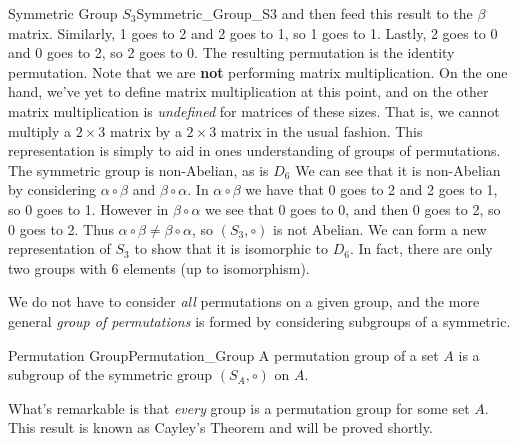\begin{lexample}{Symmetric Group $S_{3}$}{Symmetric_Group_S3}
        and then feed this result to the $\beta$ matrix. Similarly,
        1 goes to 2 and 2 goes to 1, so 1 goes to 1. Lastly, 2 goes to 0 and 0
        goes to 2, so 2 goes to 0. The resulting permutation is the identity
        permutation. Note that we are \textbf{not} performing matrix
        multiplication. On the one hand, we've yet to define matrix
        multiplication at this point, and on the other matrix multiplication is
        \textit{undefined} for matrices of these sizes. That is, we cannot
        multiply a $2\times{3}$ matrix by a $2\times{3}$ matrix in the usual
        fashion. This representation is simply to aid in ones understanding of
        groups of permutations. The symmetric group is non-Abelian, as is
        $D_{6}$ We can see that it is non-Abelian by considering
        $\alpha\circ\beta$ and $\beta\circ\alpha$. In $\alpha\circ\beta$ we have
        that 0 goes to 2 and 2 goes to 1, so 0 goes to 1. However in
        $\beta\circ\alpha$ we see that 0 goes to 0, and then 0 goes to 2, so 0
        goes to 2. Thus $\alpha\circ\beta\ne\beta\circ\alpha$, so
        $(S_{3},\circ)$ is not Abelian. We can form a new representation of
        $S_{3}$ to show that it is isomorphic to $D_{6}$. In fact, there are
        only two groups with 6 elements (up to isomorphism).
    \end{lexample}
    We do not have to consider \textit{all} permutations on a given group, and
    the more general \textit{group of permutations} is formed by considering
    subgroups of a symmetric.
    \begin{fdefinition}{Permutation Group}{Permutation_Group}
        A permutation group of a set $A$ is a subgroup of the symmetric group
        $(S_{A},\circ)$ on $A$.
    \end{fdefinition}
    What's remarkable is that \textit{every} group is a permutation group for
    some set $A$. This result is known as Cayley's
    Theorem and will be proved shortly.
